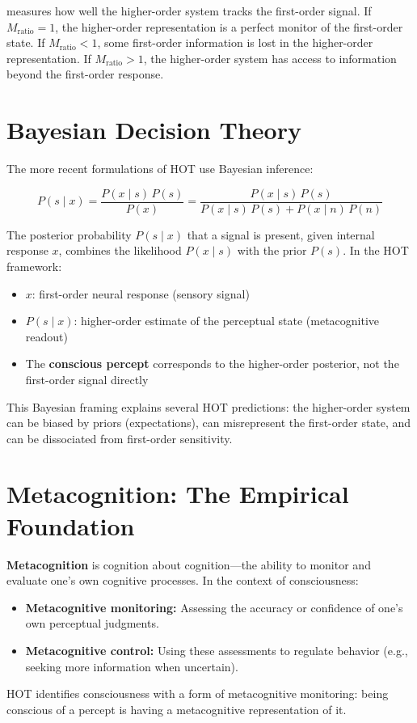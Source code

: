 \documentclass[11pt,a4paper]{report}
\begin{document}
measures how well the higher-order system tracks the first-order signal. If $M_{\text{ratio}} = 1$, the higher-order representation is a perfect monitor of the first-order state. If $M_{\text{ratio}} < 1$, some first-order information is lost in the higher-order representation. If $M_{\text{ratio}} > 1$, the higher-order system has access to information beyond the first-order response.

\section{Bayesian Decision Theory}

The more recent formulations of HOT use Bayesian inference:

\begin{mathbox}
\vspace{-8pt}
\[
  P(s \mid x) = \frac{P(x \mid s)\, P(s)}{P(x)} = \frac{P(x \mid s)\, P(s)}{P(x \mid s)\, P(s) + P(x \mid n)\, P(n)}
\]
\vspace{-10pt}
\end{mathbox}

The posterior probability $P(s \mid x)$ that a signal is present, given internal response $x$, combines the likelihood $P(x \mid s)$ with the prior $P(s)$. In the HOT framework:
\begin{itemize}[leftmargin=1.5em]
  \item $x$: first-order neural response (sensory signal)
  \item $P(s \mid x)$: higher-order estimate of the perceptual state (metacognitive readout)
  \item The \textbf{conscious percept} corresponds to the higher-order posterior, not the first-order signal directly
\end{itemize}

This Bayesian framing explains several HOT predictions: the higher-order system can be biased by priors (expectations), can misrepresent the first-order state, and can be dissociated from first-order sensitivity.

\section{Metacognition: The Empirical Foundation}

\begin{definitionbox}[Metacognition]
\textbf{Metacognition} is cognition about cognition---the ability to monitor and evaluate one's own cognitive processes. In the context of consciousness:
\begin{itemize}[leftmargin=1.5em]
  \item \textbf{Metacognitive monitoring:} Assessing the accuracy or confidence of one's own perceptual judgments.
  \item \textbf{Metacognitive control:} Using these assessments to regulate behavior (e.g., seeking more information when uncertain).
\end{itemize}
HOT identifies consciousness with a form of metacognitive monitoring: being conscious of a percept is having a metacognitive representation of it.
\end{definitionbox}
\end{document}
